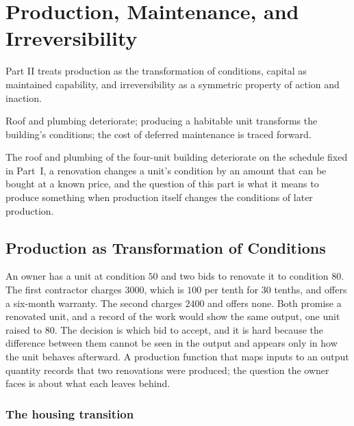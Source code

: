 \part{Production, Maintenance, and Irreversibility}
\label{part:II}

Part II treats production as the transformation of conditions, capital as maintained capability, and irreversibility as a symmetric property of action and inaction.

\begin{housing}Roof and plumbing deteriorate; producing a habitable unit transforms the building's conditions; the cost of deferred maintenance is traced forward.\end{housing}


The roof and plumbing of the four-unit building deteriorate on the schedule fixed in Part~I, a renovation changes a unit's condition by an amount that can be bought at a known price, and the question of this part is what it means to produce something when production itself changes the conditions of later production.

\chapter{Production as Transformation of Conditions}\label{ch:6}

An owner has a unit at condition $50$ and two bids to renovate it to condition $80$. The first contractor charges $3000$, which is $100$ per tenth for $30$ tenths, and offers a six-month warranty. The second charges $2400$ and offers none. Both promise a renovated unit, and a record of the work would show the same output, one unit raised to $80$. The decision is which bid to accept, and it is hard because the difference between them cannot be seen in the output and appears only in how the unit behaves afterward. A production function that maps inputs to an output quantity records that two renovations were produced; the question the owner faces is about what each leaves behind.

\section{The housing transition}

